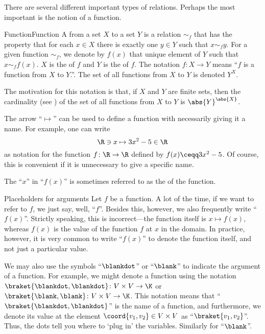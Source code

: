 There are several different important types of relations.  Perhaps the most important is the notion of a function.
\begin{dfn}{Function}{Function}
A  from a set $X$ to a set $Y$ is a relation $\sim _f$ that has the property that for each $x\in X$ there is exactly one $y\in Y$ such that $x\sim _fy$.  For a given function $\sim _f$, we denote by $f(x)$ that unique element of $Y$ such that $x\sim _ff(x)$.  $X$ is the  of $f$ and $Y$ is the  of $f$.  The notation $f\colon X\rightarrow Y$ means ``$f$ is a function from $X$ to $Y$.''.  The set of all functions from $X$ to $Y$ is denoted $Y^X$.
\begin{rmk}
The motivation for this notation is that, if $X$ and $Y$ are finite sets, then the cardinality (see ) of the set of all functions from $X$ to $Y$ is $\abs{Y}^{\abs{X}}$.
\end{rmk}
\begin{rmk}
The arrow ``$\mapsto$''\index[notation]{$\mapsto$} can be used to define a function with necessarily giving it a name.  For example, one can write
\begin{equation}
\R \ni x\mapsto 3x^2-5\in \R
\end{equation}
as notation for the function $f\colon \R \rightarrow \R$ defined by $f(x)\ceqq 3x^2-5$.  Of course, this is convenient if it is unnecessary to give a specific name.
\end{rmk}
\begin{rmk}
The ``$x$'' in ``$f(x)$'' is sometimes referred to as the  of the function.
\end{rmk}
\end{dfn}
\begin{ntn}{Placeholders for arguments}{}
Let $f$ be a function.  A lot of the time, if we want to refer to $f$, we just say, well, ``$f$''.  Besides this, however, we also frequently write ``$f(x)$''.  Strictly speaking, this is incorrect---the function itself is $x\mapsto f(x)$, whereas $f(x)$ is the value of the function $f$ at $x$ in the domain.  In practice, however, it is very common to write ``$f(x)$'' to denote the function itself, and not just a particular value.
	
We may also use the symbols ``$\blankdot$'' or ``$\blank$'' to indicate the argument of a function.  For example, we might denote a function using the notation $\braket{\blankdot ,\blankdot}\colon V\times V\rightarrow \K$ or $\braket{\blank ,\blank}\colon V\times V\rightarrow \K$.  This notation means that ``$\braket{\blankdot ,\blankdot}$'' is the name of a function, and furthermore, we denote its value at the element $\coord{v_1,v_2}\in V\times V$ as ``$\braket{v_1,v_2}$''.  Thus, the dots tell you where to `plug in' the variables.  Similarly for ``$\blank$''.
\end{ntn}
